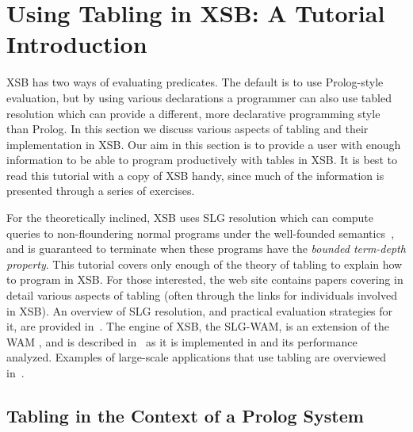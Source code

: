 
\chapter{Using Tabling in XSB: A Tutorial Introduction} 
\label{chap:TablingOverview}

XSB has two ways of evaluating predicates.  The default is to use
Prolog-style evaluation, but by using various declarations a
programmer can also use tabled resolution which can provide a
different, more declarative programming style than Prolog.  In this
section we discuss various aspects of tabling and their implementation
in XSB\@.  Our aim in this section is to provide a user with enough
information to be able to program productively with tables in XSB\@.
It is best to read this tutorial with a copy of XSB handy, since much
of the information is presented through a series of exercises.

For the theoretically inclined, XSB uses SLG resolution which can
compute queries to non-floundering normal programs under the
well-founded semantics~\cite{VGRS91}, and is guaranteed to terminate
when these programs have the {\em bounded term-depth property}.  This
tutorial covers only enough of the theory of tabling to explain how to
program in XSB\@.  For those interested, the web site contains papers
covering in detail various aspects of tabling (often through the links
for individuals involved in XSB)\@.  An overview of SLG resolution,
and practical evaluation strategies for it, are provided
in~\cite{ChWa96,Swif99b,SaSW99,FSW98}.  The engine of XSB, the
SLG-WAM, is an extension of the WAM \cite{DHWa83,AitK90}, and is
described in~\cite{SaSw98,RRSSW98,JFLP-Scheduling,SaSW96,
  ChSW95,CAT@PLILP-98,TST99,CuSW99b,CuiW00,CaSW02,MarS08b,Swif09a,MarS10,SwiW10a}
as it is implemented in \version{} and its performance
analyzed. Examples of large-scale applications that use tabling are
overviewed in~\cite{syntactica, semantica, CoDS96, DRW96, RRRSSW97,
  Boul97,CuSW99a,GSTPD00,SwiW12}.


\section{Tabling in the Context of a Prolog System}
\label{tabling_env}

